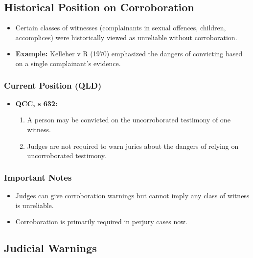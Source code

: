 \subsection{  Historical Position on
Corroboration}\label{historical-position-on-corroboration}

\begin{itemize}
\tightlist
\item
  Certain classes of witnesses (complainants in sexual offences,
  children, accomplices) were historically viewed as unreliable without
  corroboration.
\item
  \textbf{Example:} Kelleher v R (1970) emphasized the dangers of
  convicting based on a single complainant's evidence.
\end{itemize}

\subsubsection{Current Position (QLD)}\label{current-position-qld}

\begin{itemize}
\tightlist
\item
  \textbf{QCC, s 632:}

  \begin{enumerate}
  \def\labelenumi{\arabic{enumi}.}
  \tightlist
  \item
    A person may be convicted on the uncorroborated testimony of one
    witness.
  \item
    Judges are not required to warn juries about the dangers of relying
    on uncorroborated testimony.
  \end{enumerate}
\end{itemize}

\subsubsection{Important Notes}\label{important-notes}

\begin{itemize}
\tightlist
\item
  Judges can give corroboration warnings but cannot imply any class of
  witness is unreliable.
\item
  Corroboration is primarily required in perjury cases now.
\end{itemize}

\subsection{ Judicial Warnings}\label{judicial-warnings}

